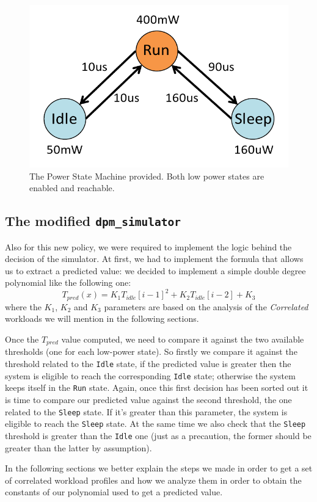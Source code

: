 \documentclass[a4paper]{article}
\begin{document}
        \begin{figure}[htp]
            \centering
            \includegraphics[width=0.35 \columnwidth]{./screenshots/PSM_case2.png}
            \caption{
                    \label{fig:PSM_case2}
                    The Power State Machine provided. Both low power states are enabled and reachable.
            }
        \end{figure}

    \subsection{The modified \texttt{dpm\_simulator}}
        Also for this new policy, we were required to implement the logic behind the decision of the simulator. At first, we had to implement the formula that allows us to extract a predicted value: we decided to implement a simple double degree polynomial like the following one:
        \begin{equation}
            T_{pred}(x) = K_1T_{idle}[i-1]^2 + K_2T_{idle}[i-2] + K_3
        \end{equation}
        where the $K_1$, $K_2$ and $K_3$ parameters are based on the analysis of the \emph{Correlated} workloads we will mention in the following sections.

        Once the $T_{pred}$ value computed, we need to compare it against the two available thresholds (one for each low-power state). So firstly we compare it against the threshold related to the \texttt{Idle} state, if the predicted value is greater then the system is eligible to reach the corresponding \texttt{Idle} state; otherwise the system keeps itself in the \texttt{Run} state.
        Again, once this first decision has been sorted out it is time to compare our predicted value against the second threshold, the one related to the \texttt{Sleep} state. If it's greater than this parameter, the system is eligible to reach the \texttt{Sleep} state. At the same time we also check that the \texttt{Sleep} threshold is greater than the \texttt{Idle} one (just as a precaution, the former should be greater than the latter by assumption).

        In the following sections we better explain the steps we made in order to get a set of correlated workload profiles and how we analyze them in order to obtain the constants of our polynomial used to get a predicted value.
\end{document}
